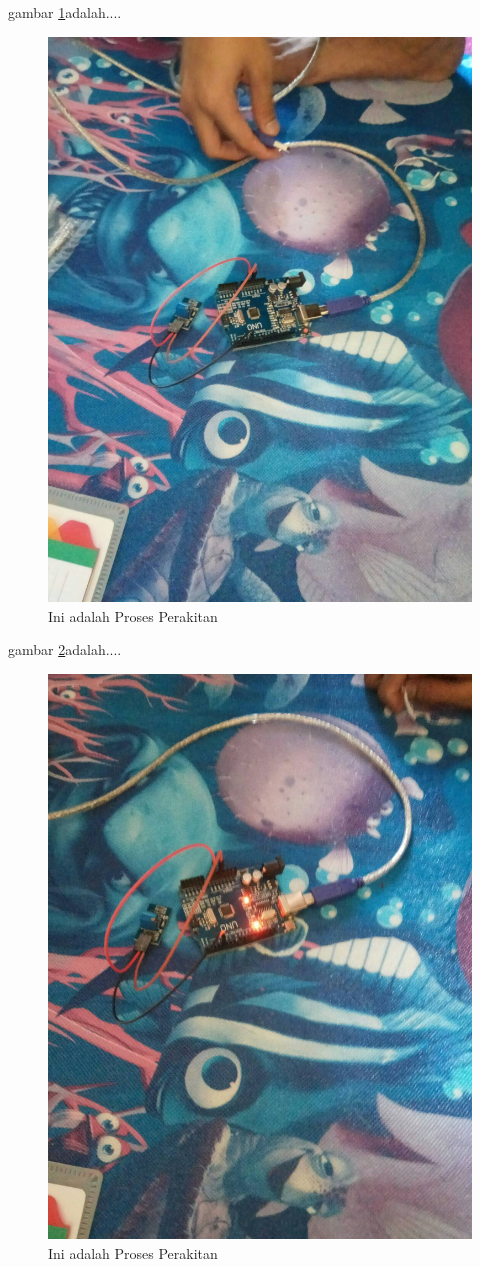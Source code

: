   gambar \ref{ar4}adalah....
  \begin{figure}[ht]
  \centerline{\includegraphics[width=.75\textwidth]{figures/ar4.jpg}}
  \caption{Ini adalah Proses Perakitan}
  \label{ar4}
  \end{figure}

  gambar \ref{ar5}adalah....
  \begin{figure}[ht]
  \centerline{\includegraphics[width=.75\textwidth]{figures/ar5.jpg}}
  \caption{Ini adalah Proses Perakitan}
  \label{ar5}
  \end{figure}

